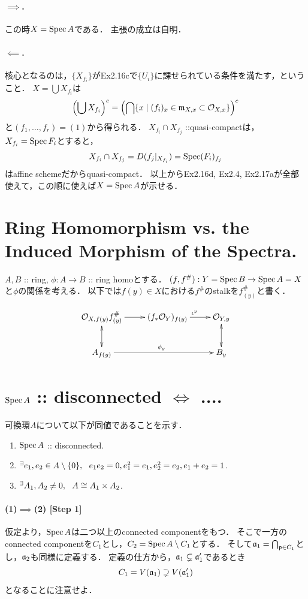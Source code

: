 \documentclass[a4paper]{jsarticle}
\newcommand{\shO}{\mathcal{O}}
\begin{document}
    \paragraph{$\implies$.}
    この時$X=\operatorname{Spec} A$である．
    主張の成立は自明．

    \paragraph{$\impliedby$.}
    核心となるのは，$\{X_{f_i}\}$がEx2.16cで$\{U_i\}$に課せられている条件を満たす，ということ．
    $X=\bigcup X_{f_i}$は
    \[ \left( \bigcup X_{f_i} \right)^c=\left( \bigcap \{x \mid (f_i)_x \in \I{m}_{X,x} \subset \shO_{X,x}\} \right)^c \]
    と$(f_1,\dots,f_r)=(1)$から得られる．
    $X_{f_i} \cap X_{f_j}$ ::quasi-compactは，$X_{f_i}=\operatorname{Spec} F_i$とすると，
    \[ X_{f_i} \cap X_{f_j}=D(f_j|_{X_{f_i}})=\operatorname{Spec} (F_i)_{f_j} \]はaffine schemeだからquasi-compact．
    以上からEx2.16d, Ex2.4, Ex2.17aが全部使えて，この順に使えば$X=\operatorname{Spec} A$が示せる．

\section{Ring Homomorphism vs. the Induced Morphism of the Spectra.} %
    $A,B$ :: ring, $\phi: A \to B$ :: ring homoとする．
    $(f,f^{\#}): Y=\operatorname{Spec} B \to \operatorname{Spec} A=X$と$\phi$の関係を考える．
    以下では$f(y) \in X$における$f^{\#}$のstalkを$f^{\#}_{(y)}$と書く．

    \[
        \xymatrix
        {
        \shO_{X,f(y)} \ar[r]^{}f^{\#}_{(y)} & (f_* \shO_{Y})_{f(y)} \ar[r]^{\iota^y}& \shO_{Y,y} \\
        A_{f(y)} \ar@{<->}[u] \ar[rr]^{\phi_{y}} & {} & B_y \ar@{<->}[u]
        }
    \]


\section{$\operatorname{Spec} A$ :: disconnected $\iff$ ....} %
    可換環$A$について以下が同値であることを示す．
    \begin{enumerate}[(1)]
    \item $\operatorname{Spec} A$ :: disconnected.
    \item ${}^{\exists} e_1, e_2 \in A \setminus \{0\},~~ e_1e_2=0, e_1^2=e_1, e_2^2=e_2, e_1+e_2=1$.
    \item ${}^{\exists} A_1, A_2 \neq 0,~~ A \cong A_1 \times A_2$.
    \end{enumerate}

    \paragraph{(1)$\implies$(2) [Step 1]}
    仮定より，$\operatorname{Spec} A$は二つ以上のconnected componentをもつ．
    そこで一方のconnected componentを$C_1$とし，$C_2=\operatorname{Spec} A \setminus C_1$とする．
    そして$\mathfrak{a}_1=\bigcap_{\mathfrak{p} \in C_1}$とし，$\mathfrak{a}_2$も同様に定義する．
    定義の仕方から，$\mathfrak{a}_1 \subsetneq \mathfrak{a}_1'$であるとき
    \[ C_1=V(\mathfrak{a}_1) \supsetneq V(\mathfrak{a}_1') \]
    となることに注意せよ．
\end{document}
